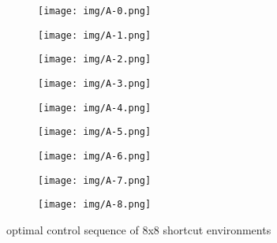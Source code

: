 \documentclass[conference]{IEEEtran}
\begin{document}
\begin{figure*}
    \centering
    \begin{subfigure}{0.3\textwidth}
    \texttt{[image: img/A-0.png]}
    \end{subfigure}
    \hfill
    \begin{subfigure}{0.3\textwidth}
    \texttt{[image: img/A-1.png]}
    \end{subfigure}
    \hfill
    \begin{subfigure}{0.3\textwidth}
    \texttt{[image: img/A-2.png]}
    \end{subfigure}

    \begin{subfigure}{0.3\textwidth}
    \texttt{[image: img/A-3.png]}
    \end{subfigure}
    \hfill
    \begin{subfigure}{0.3\textwidth}
    \texttt{[image: img/A-4.png]}
    \end{subfigure}
    \hfill
    \begin{subfigure}{0.3\textwidth}
    \texttt{[image: img/A-5.png]}
    \end{subfigure}

    \begin{subfigure}{0.3\textwidth}
    \texttt{[image: img/A-6.png]}
    \end{subfigure}
    \hfill
    \begin{subfigure}{0.3\textwidth}
    \texttt{[image: img/A-7.png]}
    \end{subfigure}
    \hfill
    \begin{subfigure}{0.3\textwidth}
    \texttt{[image: img/A-8.png]}
    \end{subfigure}
\caption{optimal control sequence of 8x8 shortcut environments}
\label{fig:known_seq}
\end{figure*}
\end{document}
